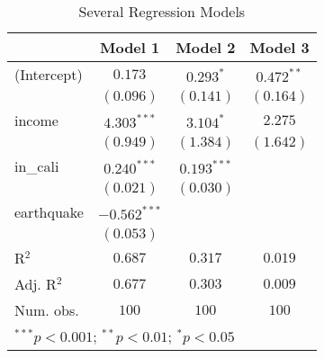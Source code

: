 
\begin{table}
\begin{center}
\begin{tabular}{l c c c}
\hline
 & Model 1 & Model 2 & Model 3 \\
\hline
(Intercept) & $0.173$        & $0.293^{*}$   & $0.472^{**}$ \\
            & $(0.096)$      & $(0.141)$     & $(0.164)$    \\
income      & $4.303^{***}$  & $3.104^{*}$   & $2.275$      \\
            & $(0.949)$      & $(1.384)$     & $(1.642)$    \\
in\_cali    & $0.240^{***}$  & $0.193^{***}$ &              \\
            & $(0.021)$      & $(0.030)$     &              \\
earthquake  & $-0.562^{***}$ &               &              \\
            & $(0.053)$      &               &              \\
\hline
R$^2$       & $0.687$        & $0.317$       & $0.019$      \\
Adj. R$^2$  & $0.677$        & $0.303$       & $0.009$      \\
Num. obs.   & $100$          & $100$         & $100$        \\
\hline
\multicolumn{4}{l}{\scriptsize{$^{***}p<0.001$; $^{**}p<0.01$; $^{*}p<0.05$}}
\end{tabular}
\caption{Several Regression Models}
\label{tab:lm_all_models}
\end{center}
\end{table}
